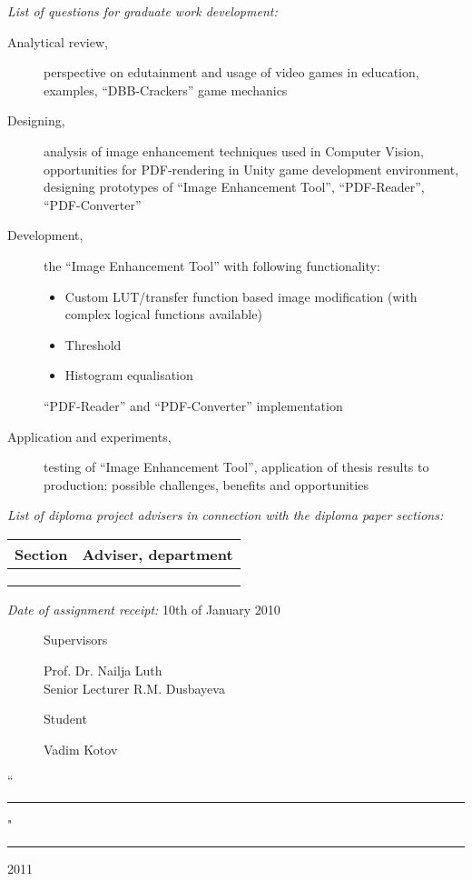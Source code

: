 \documentclass[12pt]{article}
\begin{document}
	\emph{List of questions for graduate work development:}
	\begin{description}
		\item[Analytical review,]
		perspective on edutainment and usage of video games in education, examples, ``DBB-Crackers'' game mechanics
		\item[Designing,]
		analysis of image enhancement techniques used in Computer Vision, opportunities for PDF-rendering in Unity game development environment, designing prototypes of ``Image Enhancement Tool'', ``PDF-Reader'', ``PDF-Converter''
		\item[Development,]
		the ``Image Enhancement Tool'' with following functionality:
		\begin{itemize}
			\item Custom LUT/transfer function based image modification (with complex logical functions available)
			\item Threshold 
			\item Histogram equalisation
		\end{itemize}
		``PDF-Reader'' and ``PDF-Converter'' implementation
		\item[Application and experiments,]
		testing of ``Image Enhancement Tool'', application of thesis results to production: possible challenges, benefits and opportunities
	\end{description}

	\emph{List of diploma project advisers in connection with the diploma paper sections:}

	\begin{centering}
		\begin{tabularx}{\textwidth}{|X|X|}
			\hline
			\textbf{Section} & \textbf{Adviser, department}\\
			\hline
			& \\
			\hline
			& \\
			\hline
			& \\
			\hline
		\end{tabularx}
	\end{centering}

	\emph{Date of assignment receipt:} 10th of January 2010
	
	\begin{figure}[ht]
		\begin{minipage}[t]{0.5\linewidth}
			Supervisors
		\end{minipage}
		\begin{minipage}[t]{0.5\linewidth}
			Prof. Dr. Nailja Luth\\
			Senior Lecturer R.M. Dusbayeva
		\end{minipage}
	\end{figure}
	\begin{figure}[ht]
		\begin{minipage}[t]{0.5\linewidth}
			Student
		\end{minipage}
		\begin{minipage}[t]{0.5\linewidth}
			Vadim Kotov
		\end{minipage}
	\end{figure}
	``\rule{2em}{0.4pt}" \rule{8em}{0.4pt} 2011\\
	
\end{document}
